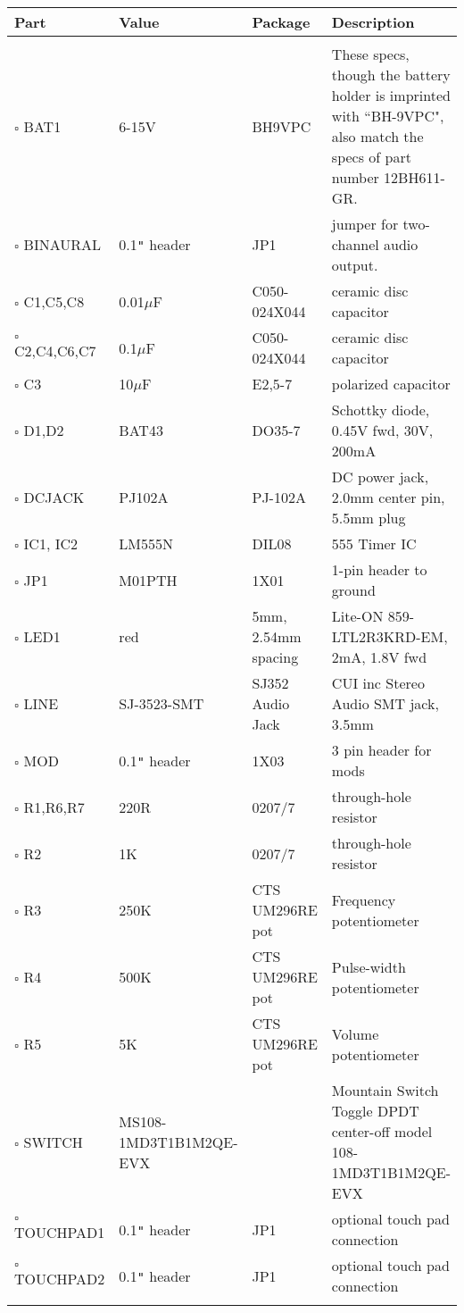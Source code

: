 \begin{footnotesize}
\begin{tabular}{l p{1.2in} p{1.7in}  p{3.3in} }

\large{\textbf{Part}} &  
\large{\textbf{Value}} &  
\large{\textbf{Package}} &  
\large{\textbf{Description}} 
\\[\sep]
\hline\\[\negsep]

$\square$ BAT1      & 6-15V       & BH9VPC & These specs, though the battery holder is imprinted with ``BH-9VPC", also match the specs of part number 12BH611-GR. \\
$\square$ BINAURAL  & 0.1\texttt{"} header & JP1 & jumper for two-channel audio output. \\
$\square$ C1,C5,C8  & 0.01$\mu$F  & C050-024X044 & ceramic disc capacitor  \\
$\square$ C2,C4,C6,C7 & 0.1$\mu$F & C050-024X044 & ceramic disc capacitor   \\
$\square$ C3        & 10$\mu$F    & E2,5-7 & polarized capacitor  \\
$\square$ D1,D2     & BAT43       & DO35-7 & Schottky diode, 0.45V fwd, 30V, 200mA \\
$\square$ DCJACK    & PJ102A      & PJ-102A & DC power jack, 2.0mm center pin, 5.5mm plug \\
$\square$ IC1, IC2  & LM555N      & DIL08 & 555 Timer IC \\
$\square$ JP1       & M01PTH      & 1X01 & 1-pin header to ground \\
$\square$ LED1      & red         & 5mm, 2.54mm spacing & Lite-ON 859-LTL2R3KRD-EM, 2mA, 1.8V fwd  \\
$\square$ LINE      & SJ-3523-SMT & SJ352 Audio Jack & CUI inc Stereo Audio SMT jack, 3.5mm \\
$\square$ MOD       & 0.1\texttt{"} header & 1X03 & 3 pin header for mods \\
$\square$ R1,R6,R7  & 220R        & 0207/7 & through-hole resistor \\
$\square$ R2        & 1K          & 0207/7 & through-hole resistor \\
$\square$ R3        & 250K        & CTS UM296RE pot & Frequency potentiometer \\
$\square$ R4        & 500K        & CTS UM296RE pot & Pulse-width potentiometer \\
$\square$ R5        & 5K          & CTS UM296RE pot & Volume potentiometer \\
$\square$ SWITCH    & MS108-1MD3T1B1M2QE-EVX &  & Mountain Switch Toggle DPDT center-off model 108-1MD3T1B1M2QE-EVX \\
$\square$ TOUCHPAD1 & 0.1\texttt{"} header & JP1 & optional touch pad connection \\
$\square$ TOUCHPAD2 & 0.1\texttt{"} header & JP1 & optional touch pad connection \\[\sep]
\hline\\[\negsep]

\end{tabular}
\end{footnotesize}
